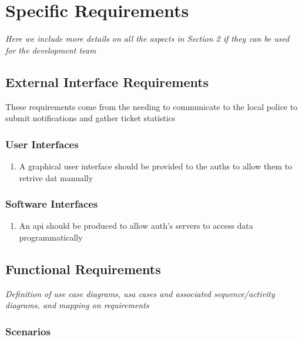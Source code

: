 \documentclass{article}
\begin{document}
\section{Specific Requirements} \textit{Here we include more details on all the aspects in Section 2 if they can be used for the development team}

	\subsection{External Interface Requirements}
		These requirements come from the needing to communicate to the local police to submit notifications and gather ticket statistics
		
		\subsubsection{User Interfaces}
			\begin{enumerate}
				\item A graphical user interface should be provided to the auths to allow them to retrive dat manually
			\end{enumerate}
			
		\subsubsection{Software Interfaces}
			\begin{enumerate}
					\item An api should be produced to allow auth's servers to access data programmatically
			\end{enumerate}
			
	\subsection{Functional Requirements} \textit{Definition of use case diagrams, usa cases and associated sequence/activity diagrams, and mapping on requirements}
	
		\subsubsection{Scenarios}
		
\end{document}
